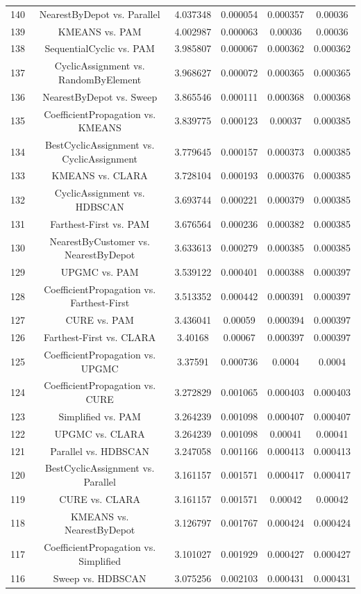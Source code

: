 \documentclass[a4paper,10pt]{article}
\begin{document}
\begin{landscape}
\begin{table}[!htp]
\begin{tabular}{cccccc}
140&NearestByDepot vs. Parallel&4.037348&0.000054&0.000357&0.00036\\
139&KMEANS vs. PAM&4.002987&0.000063&0.00036&0.00036\\
138&SequentialCyclic vs. PAM&3.985807&0.000067&0.000362&0.000362\\
137&CyclicAssignment vs. RandomByElement&3.968627&0.000072&0.000365&0.000365\\
136&NearestByDepot vs. Sweep&3.865546&0.000111&0.000368&0.000368\\
135&CoefficientPropagation vs. KMEANS&3.839775&0.000123&0.00037&0.000385\\
134&BestCyclicAssignment vs. CyclicAssignment&3.779645&0.000157&0.000373&0.000385\\
133&KMEANS vs. CLARA&3.728104&0.000193&0.000376&0.000385\\
132&CyclicAssignment vs. HDBSCAN&3.693744&0.000221&0.000379&0.000385\\
131&Farthest-First vs. PAM&3.676564&0.000236&0.000382&0.000385\\
130&NearestByCustomer vs. NearestByDepot&3.633613&0.000279&0.000385&0.000385\\
129&UPGMC vs. PAM&3.539122&0.000401&0.000388&0.000397\\
128&CoefficientPropagation vs. Farthest-First&3.513352&0.000442&0.000391&0.000397\\
127&CURE vs. PAM&3.436041&0.00059&0.000394&0.000397\\
126&Farthest-First vs. CLARA&3.40168&0.00067&0.000397&0.000397\\
125&CoefficientPropagation vs. UPGMC&3.37591&0.000736&0.0004&0.0004\\
124&CoefficientPropagation vs. CURE&3.272829&0.001065&0.000403&0.000403\\
123&Simplified vs. PAM&3.264239&0.001098&0.000407&0.000407\\
122&UPGMC vs. CLARA&3.264239&0.001098&0.00041&0.00041\\
121&Parallel vs. HDBSCAN&3.247058&0.001166&0.000413&0.000413\\
120&BestCyclicAssignment vs. Parallel&3.161157&0.001571&0.000417&0.000417\\
119&CURE vs. CLARA&3.161157&0.001571&0.00042&0.00042\\
118&KMEANS vs. NearestByDepot&3.126797&0.001767&0.000424&0.000424\\
117&CoefficientPropagation vs. Simplified&3.101027&0.001929&0.000427&0.000427\\
116&Sweep vs. HDBSCAN&3.075256&0.002103&0.000431&0.000431\\

\end{tabular}
\end{table}
\end{landscape}
\end{document}
